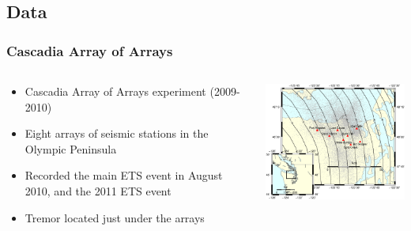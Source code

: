 \documentclass{beamer}
\begin{document}
	\subsection{Data}

	\begin{frame}
		\frametitle{Cascadia Array of Arrays}
		\begin{columns}[c]
			\begin{column}{5cm}
				\begin{itemize}
					\item Cascadia Array of Arrays experiment (2009-2010)


					\item Eight arrays of seismic stations in the Olympic Peninsula


					\item Recorded the main ETS event in August 2010, and the 2011 ETS event


					\item Tremor located just under the arrays
				\end{itemize}
			\end{column}
			\begin{column}{7cm}
				\begin{center}
					\includegraphics[trim={0cm 1cm 0cm 9.5cm}, clip, width=7cm]{AoA/arrays_location.eps}
				\end{center}
			\end{column}
		\end{columns}
	\end{frame}
\end{document}
